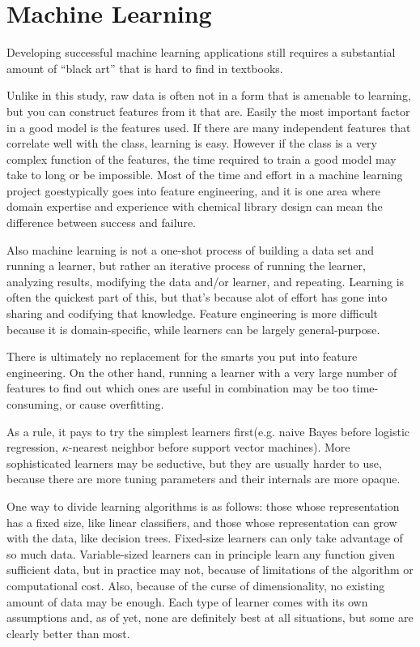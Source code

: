 \section{Machine Learning}
Developing successful machine learning applications still requires a substantial amount of “black art” that is hard to find in textbooks.\cite{Domingos2012}

Unlike in this study, raw data is often not in a form that is amenable to learning, but you can construct features from it that are. Easily the most important factor in a good model is the features used. If there are many independent features that correlate well with the class, learning is easy. However if the class is a very complex function of the features, the time required to train a good model may take to long or be impossible. \cite{Domingos2012} Most of the time and effort in a machine learning project goestypically goes into feature engineering, and it is one area where domain expertise and experience with chemical library design can mean the difference between success and failure.

Also machine learning is not a one-shot process of building a data set and running a learner, but rather an iterative process of running the learner, analyzing results, modifying the data and/or learner, and repeating. Learning is often the quickest part of this, but that’s because alot of effort has gone into sharing and codifying that knowledge. Feature engineering is more difficult because it is domain-specific, while learners can be largely general-purpose.\cite{Domingos2012}

There is ultimately no replacement for the smarts you put into feature engineering. On the other hand, running a learner with a very large number of features to find out which ones are useful in combination may be too time-consuming, or cause overfitting.\cite{Domingos2012}

As a rule, it pays to try the simplest learners first(e.g. naive Bayes before logistic regression, $\kappa$-nearest neighbor before support vector machines). More sophisticated learners may be seductive, but they are usually harder to use, because there are more tuning parameters and their internals are more opaque.\cite{Domingos2012}

One way to divide learning algorithms is as follows: those whose representation has a fixed size, like linear classifiers, and those whose representation can grow with the data, like decision trees. Fixed-size learners can only take advantage of so much data. Variable-sized learners can in principle learn any function given sufficient data, but in practice may not, because of limitations of the algorithm or computational cost. Also, because of the curse of dimensionality, no existing amount of data may be enough.\cite{Domingos2012} Each type of learner comes with its own assumptions and, as of yet, none are definitely best at all situations, but some are clearly better than most. \cite{Hand2006,Delgado2014}


